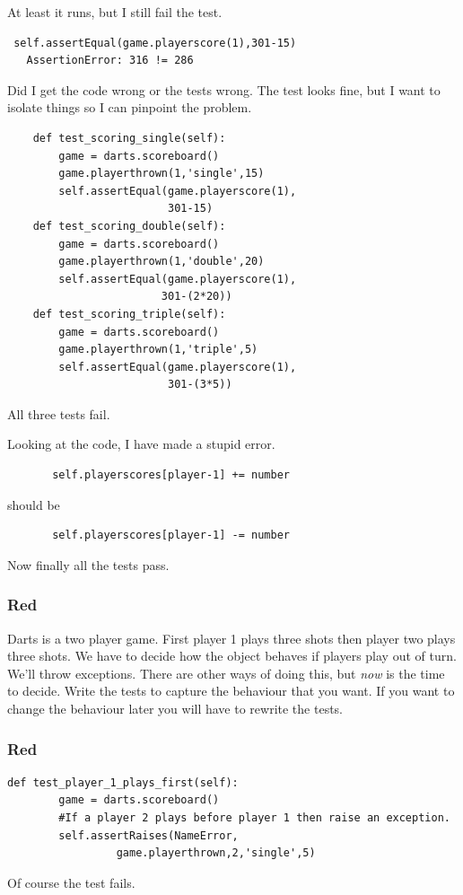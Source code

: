 \documentclass{beamer}
\begin{document}
\begin{frame}[fragile]
At least it runs, but I still fail the test.
\begin{verbatim}
 self.assertEqual(game.playerscore(1),301-15)
   AssertionError: 316 != 286
\end{verbatim}
Did I get the code wrong or the tests wrong. The test looks fine, but
I want to isolate things so I can pinpoint the problem. 
\end{frame}
\begin{frame}[fragile]
\begin{lstlisting}
    def test_scoring_single(self):
        game = darts.scoreboard()
        game.playerthrown(1,'single',15)
        self.assertEqual(game.playerscore(1),
                         301-15)
    def test_scoring_double(self):
        game = darts.scoreboard()
        game.playerthrown(1,'double',20)
        self.assertEqual(game.playerscore(1),
                        301-(2*20))
    def test_scoring_triple(self):
        game = darts.scoreboard()
        game.playerthrown(1,'triple',5)
        self.assertEqual(game.playerscore(1),
                         301-(3*5))
\end{lstlisting}
 All three tests fail.
\end{frame}
\begin{frame}[fragile]
  Looking at the code, I have made a stupid error.
\begin{lstlisting}
       self.playerscores[player-1] += number
\end{lstlisting}
should be
\begin{lstlisting}
       self.playerscores[player-1] -= number
\end{lstlisting}
Now finally all the tests pass.
\end{frame}
\begin{frame}[fragile]
\frametitle{Red}
Darts is a two player game. First player 1 plays three shots then player
two plays three shots. We have to decide how the object behaves if
players play out of turn. We'll throw exceptions. There are other ways
of doing this, but {\em now} is the time to decide. Write the tests to
capture the behaviour that you want. If you want to change the
behaviour later you will have to rewrite the tests.

\end{frame}
\begin{frame}[fragile]
\frametitle{Red}
\begin{lstlisting}
def test_player_1_plays_first(self):
        game = darts.scoreboard()
        #If a player 2 plays before player 1 then raise an exception.
        self.assertRaises(NameError, 
                 game.playerthrown,2,'single',5)   
\end{lstlisting}
Of course the test fails.
  
\end{frame}
\end{document}
